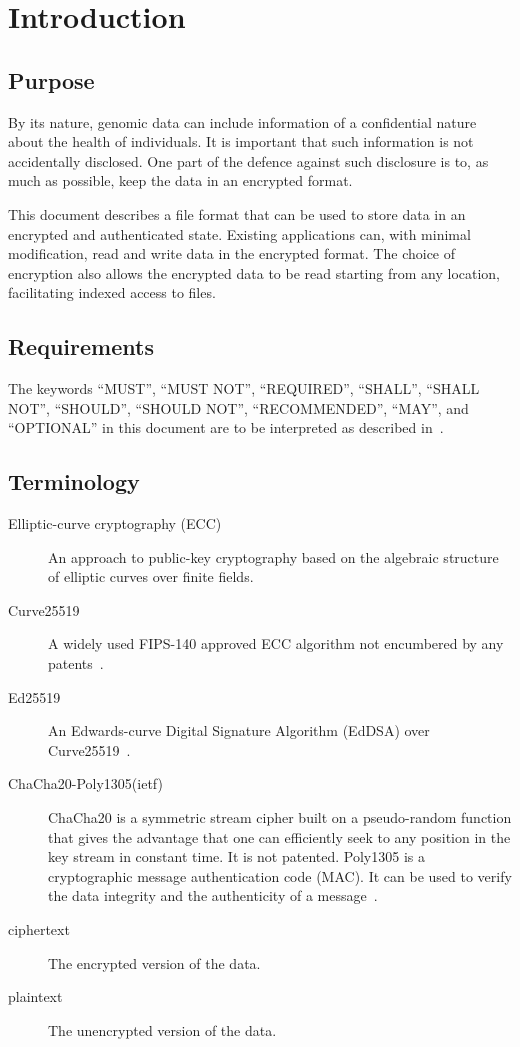\section{Introduction}
\subsection{Purpose}
By its nature, genomic data can include information of a confidential
nature about the health of individuals.
%
It is important that such information is not accidentally disclosed.
%
One part of the defence against such disclosure is to, as much as
possible, keep the data in an encrypted format.
%

This document describes a file format that can be used to store data
in an encrypted and authenticated state.
%
Existing applications can, with minimal modification, read and write
data in the encrypted format.
%
The choice of encryption also allows the encrypted data to be read
starting from any location, facilitating indexed access to files.

\subsection{Requirements}
The keywords ``MUST'', ``MUST NOT'', ``REQUIRED'', ``SHALL'', ``SHALL
NOT'', ``SHOULD'', ``SHOULD NOT'', ``RECOMMENDED'', ``MAY'', and
``OPTIONAL'' in this document are to be interpreted as described
in~\cite{RFC2119}.

\subsection{Terminology}
%
\begin{description}
\item[Elliptic-curve cryptography (ECC)] %
  An approach to public-key cryptography based on the algebraic
  structure of elliptic curves over finite fields.
\item[Curve25519] %
  A widely used FIPS-140 approved ECC algorithm not encumbered by any
  patents~\cite{RFC7748}.
\item[Ed25519] %
  An Edwards-curve Digital Signature Algorithm (EdDSA) over
  Curve25519~\cite{RFC8032}.
\item[ChaCha20-Poly1305(ietf)] %
  ChaCha20 is a symmetric stream cipher built on a pseudo-random
  function that gives the advantage that one can efficiently seek to
  any position in the key stream in constant time.
  It is not patented.
  Poly1305 is a cryptographic message authentication code (MAC).
  It can be used to verify the data integrity and the authenticity of
  a message~\cite{RFC8439}.
\item[ciphertext] %
  The encrypted version of the data.
\item[plaintext] %
  The unencrypted version of the data.
\end{description}
